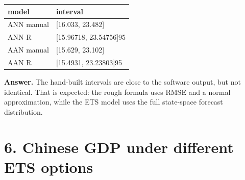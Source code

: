 \documentclass[
  11pt,
]{article}
\newcounter{none} %
\begin{document}
{\def\LTcaptype{none} %
\begin{longtable}[]{@{}ll@{}}
\toprule\noalign{}
model & interval \\
\midrule\noalign{}
\endhead
\bottomrule\noalign{}
\endlastfoot
ANN manual & {[}16.033, 23.482{]} \\
ANN R & {[}15.96718, 23.54756{]}95 \\
AAN manual & {[}15.629, 23.102{]} \\
AAN R & {[}15.4931, 23.23803{]}95 \\
\end{longtable}
}

\textbf{Answer.} The hand-built intervals are close to the software
output, but not identical. That is expected: the rough formula uses RMSE
and a normal approximation, while the ETS model uses the full
state-space forecast distribution.

\section{6. Chinese GDP under different ETS
options}\label{chinese-gdp-under-different-ets-options}
\end{document}
